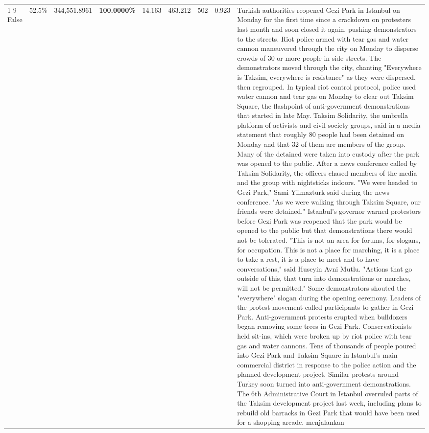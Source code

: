 \begin{table}[H]
\begin{tabular}{lllrlllll}
\cline{1-9}
False & 52.5\% & 344,551.8961 & \bfseries \color{red} 100.0000\% & 14.163 & 463.212 & 502 & 0.923 & Turkish authorities reopened Gezi Park in Istanbul on Monday for the first time since a crackdown on protesters last month and soon closed it again, pushing demonstrators to the streets. Riot police armed with tear gas and water cannon maneuvered through the city on Monday to disperse crowds of 30 or more people in side streets. The demonstrators moved through the city, chanting "Everywhere is Taksim, everywhere is resistance" as they were dispersed, then regrouped. In typical riot control protocol, police used water cannon and tear gas on Monday to clear out Taksim Square, the flashpoint of anti-government demonstrations that started in late May. Taksim Solidarity, the umbrella platform of activists and civil society groups, said in a media statement that roughly 80 people had been detained on Monday and that 32 of them are members of the group. Many of the detained were taken into custody after the park was opened to the public. After a news conference called by Taksim Solidarity, the officers chased members of the media and the group with nightsticks indoors. "We were headed to Gezi Park," Sami Yilmazturk said during the news conference. "As we were walking through Taksim Square, our friends were detained." Istanbul's governor warned protestors before Gezi Park was reopened that the park would be opened to the public but that demonstrations there would not be tolerated. "This is not an area for forums, for slogans, for occupation. This is not a place for marching, it is a place to take a rest, it is a place to meet and to have conversations," said Huseyin Avni Mutlu. "Actions that go outside of this, that turn into demonstrations or marches, will not be permitted." Some demonstrators shouted the "everywhere" slogan during the opening ceremony. Leaders of the protest movement called participants to gather in Gezi Park. Anti-government protests erupted when bulldozers began removing some trees in Gezi Park. Conservationists held sit-ins, which were broken up by riot police with tear gas and water cannons. Tens of thousands of people poured into Gezi Park and Taksim Square in Istanbul's main commercial district in response to the police action and the planned development project. Similar protests around Turkey soon turned into anti-government demonstrations. The 6th Administrative Court in Istanbul overruled parts of the Taksim development project last week, including plans to rebuild old barracks in Gezi Park that would have been used for a shopping arcade. menjalankan \\

\end{tabular}
\end{table}
